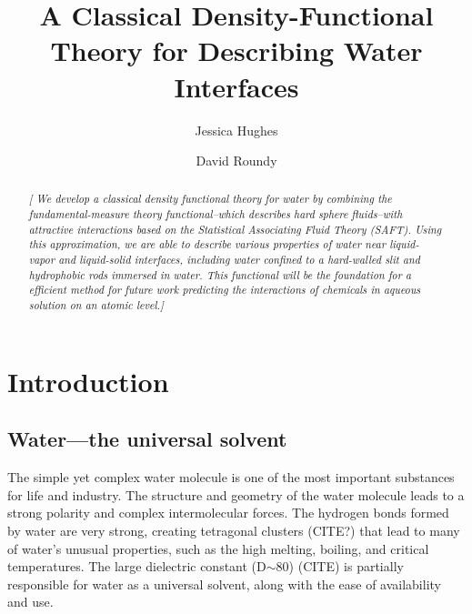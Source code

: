 \documentclass[letterpaper,twocolumn,amsmath,amssymb,prb]{revtex4-1}
\newcommand{\needsworklater}[1]{\emph{[#1]}}
\begin{document}
\title{A Classical Density-Functional Theory for Describing Water Interfaces}

\author{Jessica Hughes}

\author{David Roundy}

\begin{abstract}
\needsworklater{ We develop a classical density functional theory for
  water by combining the fundamental-measure theory functional--which
  describes hard sphere fluids--with attractive interactions based on the 
  Statistical Associating Fluid Theory (SAFT).  Using
  this approximation, we are able to describe various properties of
  water near liquid-vapor and liquid-solid interfaces, including water confined 
  to a hard-walled slit and hydrophobic rods immersed in water.  This functional 
  will be the foundation for a efficient method for future work
  predicting the interactions of chemicals in aqueous solution on an
  atomic level.}

\tableofcontents
\end{abstract}

\maketitle

\section{Introduction}

\subsection{Water---the universal solvent}

The simple yet complex water molecule is one of the most important 
substances for life and industry. The structure and geometry of the 
water molecule leads to a strong polarity and complex intermolecular
forces. The hydrogen bonds formed by water are very strong, creating
tetragonal clusters (CITE?) that lead to many of water's unusual properties,
such as the high melting, boiling, and critical temperatures.
The large dielectric constant (D$\sim$80) (CITE) is partially responsible for
water as a universal solvent, along with the ease of availability and use.
\end{document}
